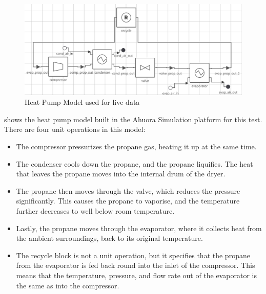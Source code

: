 \begin{figure}
    \centering
    \includegraphics[width=\textwidth]{heatpumpmodel.png}
    \caption{Heat Pump Model used for live data}
    \label{fig:heatpumpmodel}
\end{figure}

 shows the heat pump model built in the Ahuora Simulation platform for this test. There are four unit operations in this model:

\begin{itemize}
    \item The compressor pressurizes the propane gas, heating it up at the same time. 
    \item The condenser cools down the propane, and the propane liquifies. The heat that leaves the propane moves into the internal drum of the dryer.
    \item The propane then moves through the valve, which reduces the pressure significantly. This causes the propane to vaporise, and the temperature further decreases to well below room temperature.
    \item Lastly, the propane moves through the evaporator, where it collects heat from the ambient surroundings, back to its original temperature.
    \item The recycle block is not a unit operation, but it specifies that the propane from the evaporator is fed back round into the inlet of the compressor. This means that the temperature, pressure, and flow rate out of the evaporator is the same as into the compressor.
\end{itemize}


